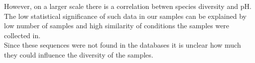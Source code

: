 \documentclass[12pt,twocolumn]{article}
\begin{document}
However, on a larger scale there is a correlation betwen species diversity and pH\cite{Thompson2017,Fierer2006,Wu2016}. The low statistical significance of such data in our samples can be explained by low number of samples and high similarity of conditions the samples were collected in.
\\
Since these sequences were not found in the databases it is unclear how much they could influence the diversity of the samples.



\newpage


\end{document}
